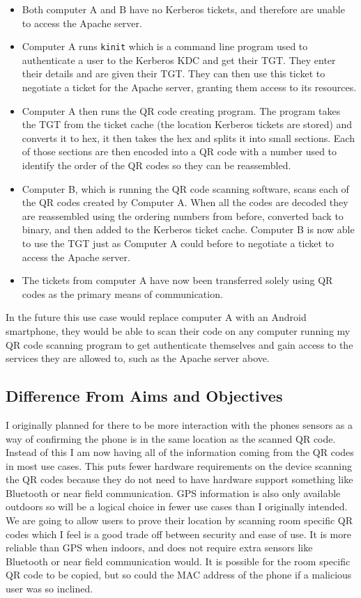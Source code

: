 \documentclass[]{report}   %
\begin{document}
\begin{itemize}
	\item Both computer A and B have no Kerberos tickets, and therefore are unable to access the Apache server.
	\item Computer A runs \texttt{kinit} which is a command line program used to authenticate a user to the Kerberos KDC and get their TGT. They enter their details and are given their TGT. They can then use this ticket to negotiate a ticket for the Apache server, granting them access to its resources.
	\item Computer A then runs the QR code creating program. The program takes the TGT from the ticket cache (the location Kerberos tickets are stored) and converts it to hex, it then takes the hex and splits it into small sections. Each of those sections are then encoded into a QR code with a number used to identify the order of the QR codes so they can be reassembled. 
	\item Computer B, which is running the QR code scanning software, scans each of the QR codes created by Computer A. When all the codes are decoded they are reassembled using the ordering numbers from before, converted back to binary, and then added to the Kerberos ticket cache. Computer B is now able to use the TGT just as Computer A could before to negotiate a ticket to access the Apache server.
	\item The tickets from computer A have now been transferred solely using QR codes as the primary means of communication.
\end{itemize}

In the future this use case would replace computer A with an Android smartphone, they would be able to scan their code on any computer running my QR code scanning program to get authenticate themselves and gain access to the services they are allowed to, such as the Apache server above.


\subsection{Difference From Aims and Objectives} 
I originally planned for there to be more interaction with the phones sensors as a way of confirming the phone is in the same location as the scanned QR code. Instead of this I am now having all of the information coming from the QR codes in most use cases. This puts fewer hardware requirements on the device scanning the QR codes because they do not need to have hardware support something like Bluetooth or near field communication. GPS information is also only available outdoors so will be a logical choice in fewer use cases than I originally intended. We are going to allow users to prove their location by scanning room specific QR codes which I feel is a good trade off between security and ease of use. It is more reliable than GPS when indoors, and does not require extra sensors like Bluetooth or near field communication would. It is possible for the room specific QR code to be copied, but so could the MAC address of the phone if a malicious user was so inclined.
\end{document}
